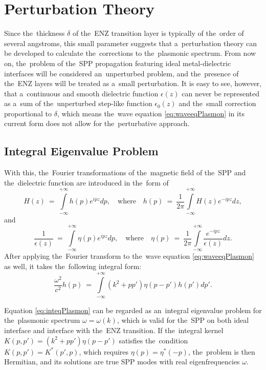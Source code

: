 \section{Perturbation Theory}

Since the~thickness $\delta$ of the~ENZ transition layer is typically of the~order of several angstroms, this small parameter suggests that a~perturbation theory can be developed to calculate the~corrections to the~plasmonic spectrum.
From now on, the~problem of the~SPP propagation featuring ideal metal-dielectric interfaces will be considered an~unperturbed problem, and the~presence of the~ENZ layers will be treated as a~small perturbation.
It is easy to see, however, that a~continuous and smooth dielectric function $\epsilon(z)$ can never be represented as a~sum of the~unperturbed step-like function $\epsilon_0(z)$ and the~small correction proportional to $\delta$, which means the~wave equation \cref{eq:waveeqPlasmon} in its current form does not allow for the~perturbative approach.

\subsection{Integral Eigenvalue Problem}

With this, the~Fourier transformations of the~magnetic field of the~SPP and the~dielectric function are introduced in the~form of
\begin{equation}
\label{eq:fourierH}
H(z)~=~\int\limits_{-\infty}^{+\infty}h(p)e^{ipz}dp, \quad \textrm{where} \quad
h(p)~=~\frac{1}{2\pi}\int\limits_{-\infty}^{+\infty}H(z)e^{-ipz}dz,
\end{equation}
and
\begin{equation}
\label{eq:fourierEPS}
\frac{1}{\epsilon(z)}~=~\int\limits_{-\infty}^{+\infty}\eta(p)e^{ipz}dp, \quad \textrm{where} \quad
\eta(p)~=~\frac{1}{2\pi}\int\limits_{-\infty}^{+\infty}\frac{e^{-ipz}}{\epsilon(z)}dz.
\end{equation}
After applying the~Fourier transform to the~wave equation \cref{eq:waveeqPlasmon} as well, it takes the~following integral form:
\begin{equation}
\label{eq:inteqPlasmon}
\frac{\omega^2}{c^2}h\left(p\right)~=~\int\limits_{-\infty}^{+\infty}\left(k^2+pp'\right)\eta (p-p') h(p') dp'.
\end{equation}

Equation \cref{eq:inteqPlasmon} can be regarded as an~integral eigenvalue problem for the~plasmonic spectrum $\omega = \omega(k)$, which is valid for the~SPP on both ideal interface and interface with the~ENZ transition.
If the~integral kernel $K(p,p') = \left(k^2+pp'\right)\eta (p-p')$ satisfies the~condition $K(p,p')=K^{*}(p',p)$, which requires $\eta(p) = \eta^{*}(-p)$, the~problem is then Hermitian, and its solutions are true SPP modes with real eigenfrequencies $\omega$.

